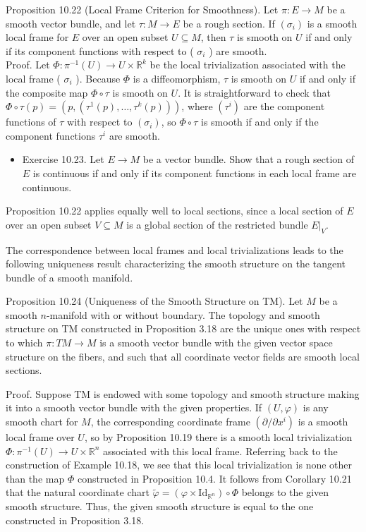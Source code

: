 \documentclass[10pt]{article}
\begin{document}
Proposition 10.22 (Local Frame Criterion for Smoothness). Let $\pi: E \rightarrow M$ be a smooth vector bundle, and let $\tau: M \rightarrow E$ be a rough section. If $\left(\sigma_{i}\right)$ is a smooth local frame for $E$ over an open subset $U \subseteq M$, then $\tau$ is smooth on $U$ if and only if its component functions with respect to ( $\sigma_{i}$ ) are smooth.\\
Proof. Let $\Phi: \pi^{-1}(U) \rightarrow U \times \mathbb{R}^{k}$ be the local trivialization associated with the local frame ( $\sigma_{i}$ ). Because $\Phi$ is a diffeomorphism, $\tau$ is smooth on $U$ if and only if the composite map $\Phi \circ \tau$ is smooth on $U$. It is straightforward to check that $\Phi \circ \tau(p)=\left(p,\left(\tau^{1}(p), \ldots, \tau^{k}(p)\right)\right)$, where $\left(\tau^{i}\right)$ are the component functions of $\tau$ with respect to $\left(\sigma_{i}\right)$, so $\Phi \circ \tau$ is smooth if and only if the component functions $\tau^{i}$ are smooth.

\begin{itemize}
  \item Exercise 10.23. Let $E \rightarrow M$ be a vector bundle. Show that a rough section of $E$ is continuous if and only if its component functions in each local frame are continuous.
\end{itemize}

Proposition 10.22 applies equally well to local sections, since a local section of $E$ over an open subset $V \subseteq M$ is a global section of the restricted bundle $\left.E\right|_{V}$.

The correspondence between local frames and local trivializations leads to the following uniqueness result characterizing the smooth structure on the tangent bundle of a smooth manifold.

Proposition 10.24 (Uniqueness of the Smooth Structure on TM). Let $M$ be a smooth $n$-manifold with or without boundary. The topology and smooth structure on TM constructed in Proposition 3.18 are the unique ones with respect to which $\pi: T M \rightarrow M$ is a smooth vector bundle with the given vector space structure on the fibers, and such that all coordinate vector fields are smooth local sections.

Proof. Suppose TM is endowed with some topology and smooth structure making it into a smooth vector bundle with the given properties. If $(U, \varphi)$ is any smooth chart for $M$, the corresponding coordinate frame $\left(\partial / \partial x^{i}\right)$ is a smooth local frame over $U$, so by Proposition 10.19 there is a smooth local trivialization $\Phi: \pi^{-1}(U) \rightarrow U \times \mathbb{R}^{n}$ associated with this local frame. Referring back to the construction of Example 10.18, we see that this local trivialization is none other than the map $\Phi$ constructed in Proposition 10.4. It follows from Corollary 10.21 that the natural coordinate chart $\widetilde{\varphi}=\left(\varphi \times \mathrm{Id}_{\mathbb{R}^{n}}\right) \circ \Phi$ belongs to the given smooth structure. Thus, the given smooth structure is equal to the one constructed in Proposition 3.18.
\end{document}
